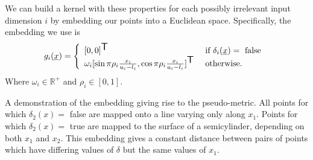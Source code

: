 \documentclass[landscape,a0b,final,a4resizeable]{include/a0poster}
\newcommand{\vect}[1]{\underline{\smash{#1}}}
\renewcommand{\v}[1]{\vect{#1}}
\newcommand{\reals}{\mathds{R}}
\newcommand{\sX}{\mathcal{X}}
\newcommand{\br}{}%
\newcommand\transpose{{\textrm{\tiny{\sf{T}}}}}
\newcommand{\embeddingletter}{g}
\begin{document}
\begin{poster}
\begin{multicols}{3}
\newpage 
{}

We can build a kernel with these properties for each possibly irrelevant input dimension $i$ by embedding our points into a Euclidean space.  Specifically, the embedding we use is
%
%
%
\begin{equation}
\embeddingletter_i\br(\v{x}) = \left\{\begin{array}{ll}
[0,0]^\transpose & \textrm{ if } \delta_i(\v{x}) = \textrm{ false }\\
\omega_i [\sin{\pi\rho_i\frac{x_i}{u_i-l_i}}, \cos{\pi\rho_i\frac{x_i}{u_i-l_i}}]^\transpose & \textrm{ otherwise.}\end{array}\right.
\label{eq:embedding}
\end{equation}
Where $\omega_i \in \mathbb{R}^+$ and $\rho_i \in [0,1]$.
%


\centering
\label{fig:cylinder}

A demonstration of the embedding giving rise to the pseudo-metric.  All points for which $\delta_2(x) =$ false are mapped onto a line varying only along $x_1$.  Points for which $\delta_2(x) =$ true are mapped to the surface of a semicylinder, depending on both $x_1$ and $x_2$.  This embedding gives a constant distance between pairs of points which have differing values of $\delta$ but the same values of $x_1$.



\end{multicols}
\end{poster}
\end{document}
